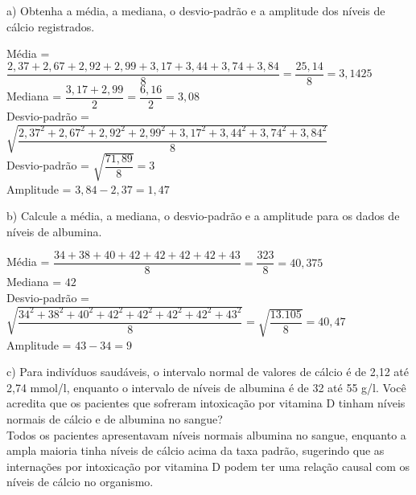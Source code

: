 \documentclass[12pt,a4paper]{article}
\begin{document}
	\vspace{0.5cm}
	a) Obtenha a média, a mediana, o desvio-padrão e a amplitude dos níveis de cálcio registrados.\\
	\begin{center}
		Média = $\dfrac{2,37 + 2,67 + 2,92 + 2,99 + 3,17 + 3,44 + 3,74 + 3,84}{8} = \dfrac{25,14}{8} = 3,1425$
		\vspace{0.5cm}\\
		Mediana = $\dfrac{3,17 + 2,99}{2} = \dfrac{6,16}{2} = 3,08$
		\vspace{0.5cm}\\
		Desvio-padrão = $\sqrt{\dfrac{2,37^2 + 2,67^2 + 2,92^2 + 2,99^2 + 3,17^2 + 3,44^2 + 3,74^2 + 3,84^2}{8}}$
		\vspace{0.1cm}\\
		Desvio-padrão = $\sqrt{\dfrac{71,89}{8}} = 3$
		\vspace{0.5cm}\\
		Amplitude = $3,84 - 2,37 = 1,47$ 
	\end{center}
	\vspace{1cm}
	b) Calcule a média, a mediana, o desvio-padrão e a amplitude para os dados de níveis de albumina.\\
	\begin{center}
		Média = $\dfrac{34 + 38 + 40 + 42 + 42 + 42 + 42 + 43}{8} = \dfrac{323}{8} = 40,375$
		\vspace{0.5cm}\\
		Mediana = $42$
		\vspace{0.5cm}\\
		Desvio-padrão = $\sqrt{\dfrac{34^2 + 38^2 + 40^2 + 42^2 + 42^2 + 42^2 + 42^2 + 43^2}{8}} = \sqrt{\dfrac{13.105}{8}} = 40,47$
		\vspace{0.5cm}\\
		Amplitude = $43 - 34 = 9$ 
	\end{center}
	\vspace{1cm}
	c) Para indivíduos saudáveis, o intervalo normal de valores de cálcio é de 2,12 até 2,74 mmol/l, enquanto o intervalo de níveis de albumina é de 32 até 55 g/l. Você acredita que os pacientes que sofreram intoxicação por vitamina D tinham níveis normais de cálcio e de albumina no sangue?
	\vspace{0.5cm}\\
	Todos os pacientes apresentavam níveis normais albumina no sangue, enquanto a ampla maioria tinha níveis de cálcio acima da taxa padrão, sugerindo que as internações por intoxicação por vitamina D podem ter uma relação causal com os níveis de cálcio no organismo.
\end{document}
